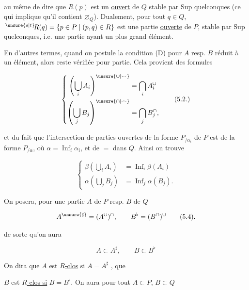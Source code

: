 au même de dire que $R(p)$ est un \uline{ouvert} de $Q$ stable par Sup quelconques (ce qui implique qu'il contient $\varnothing_Q$). Dualement, pour tout $q\in Q$, $\,{}^{\unsure{s|t}}\!R(q)=\{p\in P\mid(p,q)\in R\}$ est une partie \uline{ouverte} de $P$, stable par Sup quelconques, i.e. une partie   ayant un plus grand élément.

En d'autres termes, quand on postule la condition (D) pour $A$ resp. $B$ réduit à un élément, alors  reste vérifiée pour  partie. Cela provient des  formules

\[
\left\{\begin{aligned}
 \left(\bigcup_i A_i\right)^{\unsure{\cup|\smile}}&=\bigcap_i A_i^\cup\\
 \left(\bigcup_j B_j\right)^{\unsure{\cap|\frown}}&=\bigcap_j B_j^\cap,
\end{aligned}\right.
\tag*{(5.2.)}
\]

et du fait que l'intersection de parties ouvertes de la forme $P_{/\alpha_i}$ de $P$ est de la forme $P_{/\alpha}$, où $\alpha=\mathop{\mathrm{Inf}}_i\alpha_i$, et de $=$ dans $Q$. Ainsi on trouve

\[
\left\{\begin{aligned}
 \beta\left(\bigcup_i A_i\right)&=\mathop{\mathrm{Inf}}_i\beta(A_i)\\
 \alpha\left(\bigcup_j B_j\right)&=\mathop{\mathrm{Inf}}_j\alpha(B_j).
\end{aligned}\right.
\tag*{(5.3.)}
\]

On posera, pour une partie $A$ de $P$ resp. $B$ de $Q$

\[
 A^{\unsure{\sharp}}=(A^\cup)^\cap,\qquad B^\flat=(B^\cap)^\cup
\tag*{(5.4).}
\]

 de sorte qu'on aura

\[
 A\subset A^\sharp,\qquad B\subset B^\flat
\tag*{(5.5.)}
\]



On dira que $A$ est \uline{$R$-clos} si $A=A^\sharp$ , que

$B$ est \uline{$R$-clos si} $B=B^\flat$. On aura pour tout  $A\subset P$, $B\subset Q$

